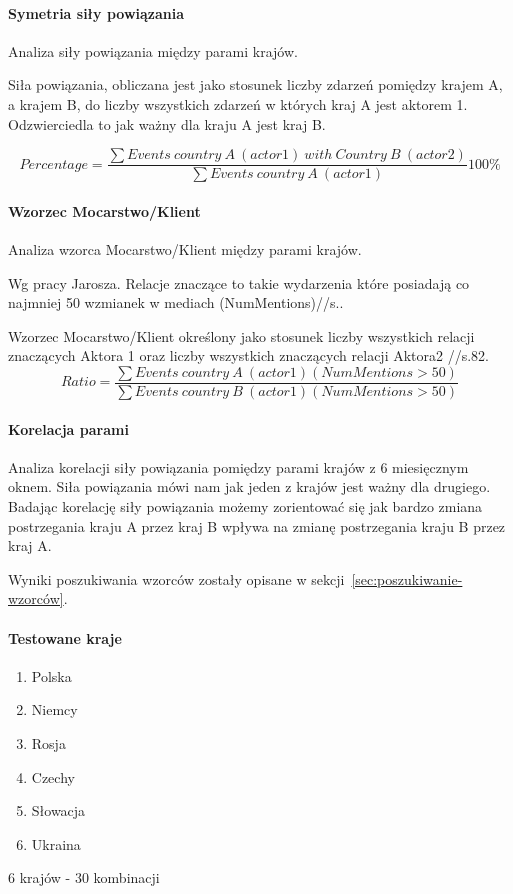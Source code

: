 \documentclass[11pt]{report}
\begin{document}
    \paragraph{Symetria siły powiązania}
    Analiza siły powiązania między parami krajów.

    Siła powiązania, obliczana jest jako stosunek liczby zdarzeń pomiędzy krajem A, a krajem B, do liczby wszystkich zdarzeń w których kraj A jest aktorem 1.
    Odzwierciedla to jak ważny dla kraju A jest kraj B\@.


    \[ Percentage = \frac
    {\sum{Events\ country\ A\ (actor 1)\ with\ Country\ B\ (actor 2)}}
    {\sum{Events\ country\ A\ (actor 1)}}
    100 \%
    \]

    \paragraph{Wzorzec Mocarstwo/Klient}
    Analiza wzorca Mocarstwo/Klient między parami krajów.

    Wg pracy Jarosza.
    Relacje znaczące to takie wydarzenia które posiadają co najmniej 50 wzmianek w mediach (NumMentions)//s..

    Wzorzec Mocarstwo/Klient określony jako stosunek liczby wszystkich relacji znaczących Aktora 1 oraz liczby wszystkich znaczących relacji Aktora2 //s.\@ 82.
    \[ Ratio = \frac
    {\sum{Events\ country\ A\ (actor 1) (NumMentions > 50)}}
    {\sum{Events\ country\ B\ (actor 1) (NumMentions > 50)}}
    \]

    \paragraph{Korelacja parami}
    Analiza korelacji siły powiązania pomiędzy parami krajów z 6 miesięcznym oknem.
    Siła powiązania mówi nam jak jeden z krajów jest ważny dla drugiego.
    Badając korelację siły powiązania możemy zorientować się jak bardzo zmiana postrzegania kraju A przez kraj B wpływa
    na zmianę postrzegania kraju B przez kraj A\@.

    Wyniki poszukiwania wzorców zostały opisane w sekcji~\ref{sec:poszukiwanie-wzorców}.

    \paragraph{Testowane kraje}
    \begin{enumerate}
        \item Polska
        \item Niemcy
        \item Rosja
        \item Czechy
        \item Słowacja
        \item Ukraina
    \end{enumerate}
    6 krajów - 30 kombinacji
\end{document}
